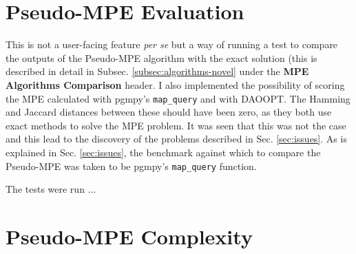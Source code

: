 \section{Pseudo-MPE Evaluation}
This is not a user-facing feature \textit{per se} but a way of running a test to compare the outputs of the Pseudo-MPE algorithm with the exact solution (this is described in detail in Subsec. \ref{subsec:algorithms-novel} under the \textbf{MPE Algorithms Comparison} header.
I also implemented the possibility of scoring the MPE calculated with pgmpy's \texttt{map\_query} and with DAOOPT.
The Hamming and Jaccard distances between these should have been zero, as they both use exact methods to solve the MPE problem.
It was seen that this was not the case and this lead to the discovery of the problems described in Sec. \ref{sec:issues}.
As is explained in Sec. \ref{sec:issues}, the benchmark against which to compare the Pseudo-MPE was taken to be pgmpy's \texttt{map\_query} function.

The tests were run ...


\section{Pseudo-MPE Complexity}